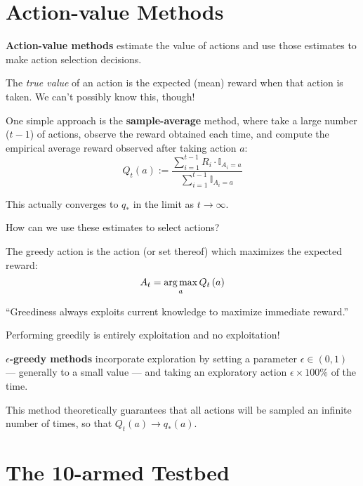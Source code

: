 \eit 


\section{Action-value Methods}

\bit
	\item \textbf{Action-value methods} estimate the value of actions and use those estimates to make action selection decisions.
	\bit
		\item The \emph{true value} of an action is the expected (mean) reward when that action is taken. We can't possibly know this, though!
	\eit
	\item One simple approach is the \textbf{sample-average} method, where take a large number ($t-1$) of actions, observe the reward obtained each time, and compute the empirical average reward observed after taking action $a$: 
	\begin{equation}
		Q_t\left(a\right) := \frac{\sum_{i=1}^{t-1} R_i \cdot \mathbb{I}_{A_i=a}}{\sum_{i=1}^{t-1}\mathbb{I}_{A_i=a}}	
	\end{equation}
	\bit
		\item This actually converges to $q_*$ in the limit as $t \rightarrow \infty$.
	\eit
	\item How can we use these estimates to select actions?
	\bit
		\item The greedy action is the action (or set thereof) which maximizes the expected reward: 
		\begin{equation}
			A_t = \operatorname*{arg\,max}_a Q_t\left(a\right)		
		\end{equation} 
		\item ``Greediness always exploits current knowledge to maximize immediate reward.''
		\item Performing greedily is entirely exploitation and no exploitation!
	\eit
	\item \textbf{$\epsilon$-greedy methods} incorporate exploration by setting a parameter $\epsilon \in \left(0,1\right)$ --- generally to a small value --- and taking an exploratory action $\epsilon \times 100 \%$ of the time.
	\bit
		\item This method theoretically guarantees that all actions will be sampled an infinite number of times, so that $Q_t\left(a\right) \rightarrow q_*\left(a\right)$.
	\eit
	
\eit



\section{The 10-armed Testbed}

